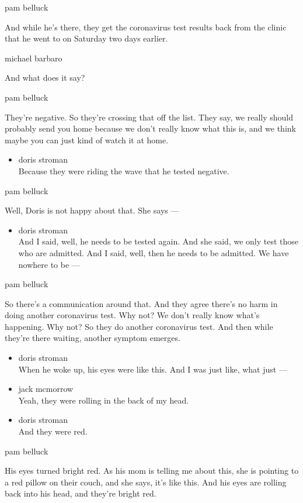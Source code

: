 pam belluck

And while he's there, they get the coronavirus test results back from
the clinic that he went to on Saturday two days earlier.

michael barbaro

And what does it say?

pam belluck

They're negative. So they're crossing that off the list. They say, we
really should probably send you home because we don't really know what
this is, and we think maybe you can just kind of watch it at home.

\begin{itemize}
\tightlist
\item
  doris stroman\\
  Because they were riding the wave that he tested negative.
\end{itemize}

pam belluck

Well, Doris is not happy about that. She says ---

\begin{itemize}
\tightlist
\item
  doris stroman\\
  And I said, well, he needs to be tested again. And she said, we only
  test those who are admitted. And I said, well, then he needs to be
  admitted. We have nowhere to be ---
\end{itemize}

pam belluck

So there's a communication around that. And they agree there's no harm
in doing another coronavirus test. Why not? We don't really know what's
happening. Why not? So they do another coronavirus test. And then while
they're there waiting, another symptom emerges.

\begin{itemize}
\item
  doris stroman\\
  When he woke up, his eyes were like this. And I was just like, what
  just ---
\item
  jack mcmorrow\\
  Yeah, they were rolling in the back of my head.
\item
  doris stroman\\
  And they were red.
\end{itemize}

pam belluck

His eyes turned bright red. As his mom is telling me about this, she is
pointing to a red pillow on their couch, and she says, it's like this.
And his eyes are rolling back into his head, and they're bright red.

